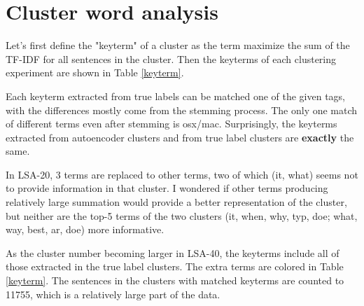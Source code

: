 \documentclass[12pt]{article}
\begin{document}
\section{Cluster word analysis}
\par Let's first define the "keyterm" of a cluster
as the term maximize the sum of the TF-IDF for all
sentences in the cluster. Then the keyterms of each
clustering experiment are shown in Table \ref{keyterm}.
\par Each keyterm extracted from true labels can be matched
one of the given tags, with the differences mostly come
from the stemming process. The only one match of
different terms even after stemming is osx/mac. Surprisingly,
the keyterms extracted from autoencoder clusters and from true
label clusters are {\bf exactly} the same.
\par In LSA-20, 3 terms are replaced to other terms,
two of which (it, what) seems not to provide information
in that cluster. I wondered if other terms
producing relatively large summation would provide a better
representation of the cluster, but neither are the top-5
terms of the two clusters (it, when, why, typ, doe; what,
way, best, ar, doe) more informative.
\par As the cluster number becoming larger in LSA-40, the
keyterms include all of those extracted in the true label
clusters. The extra terms are colored in Table \ref{keyterm}.
The sentences in the clusters with matched keyterms
are counted to 11755, which is a relatively large part
of the data.
\end{document}
